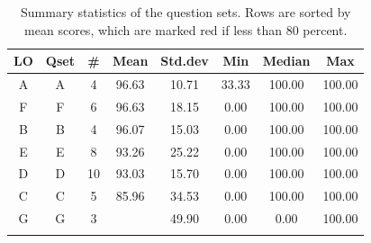 \documentclass[12pt,english,nohyper]{tufte-handout}\usepackage[]{graphicx}\usepackage[]{color}
\begin{document}
\begin{fullwidth}
\makeatletter\setlength\hsize{\@tufte@fullwidth}\makeatother
\begin{longtable}{cc|ccc|ccc}
  \hline
LO & Qset & \# & Mean & Std.dev & Min & Median & Max \\ 
  \hline
A & A &   4 & 96.63 & 10.71 & 33.33 & 100.00 & 100.00 \\ 
  F & F &   6 & 96.63 & 18.15 & 0.00 & 100.00 & 100.00 \\ 
  B & B &   4 & 96.07 & 15.03 & 0.00 & 100.00 & 100.00 \\ 
  E & E &   8 & 93.26 & 25.22 & 0.00 & 100.00 & 100.00 \\ 
  D & D &  10 & 93.03 & 15.70 & 0.00 & 100.00 & 100.00 \\ 
  C & C &   5 & 85.96 & 34.53 & 0.00 & 100.00 & 100.00 \\ 
  G & G &   3 & \color{red}{43.82} & 49.90 & 0.00 & 0.00 & 100.00 \\ 
   \hline
\hline
\caption{Summary statistics of the question sets. Rows are sorted by mean scores, which are marked red if less than 80 percent.} 
\label{tab:QuestionSet_summary}
\end{longtable}

\end{fullwidth}
\end{document}
